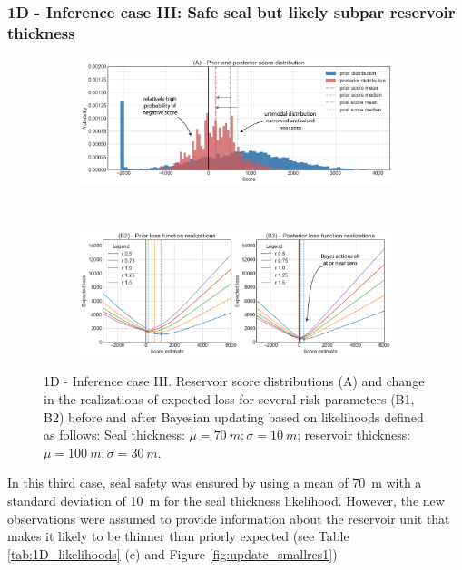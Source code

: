 				\subsubsection{1D - Inference case III: Safe seal but likely subpar reservoir thickness}
				\begin{figure}[h]
					\begin{subfigure}{1\textwidth}
						\centering
						\includegraphics[width=1\linewidth]{Figures/update_smallres2.png}
					\end{subfigure}%
					\\
					\begin{subfigure}{1\textwidth}
						\centering
						\includegraphics[width=1\linewidth]{Figures/update_smallres3.png}
					\end{subfigure}
					\caption{1D - Inference case III. Reservoir score distributions (A) and change in the realizations of expected loss for several risk parameters (B1, B2) before and after Bayesian updating based on likelihoods defined as follows: Seal thickness: $\mu = 70~m; \sigma = 10~m$; reservoir thickness: $\mu = 100~m; \sigma = 30~m$.}
					\label{fig:update_smallres2_3}
				\end{figure}
				In this third case, seal safety was ensured by using a mean of 70~m with a standard deviation of 10~m for the seal thickness likelihood. However, the new observations were assumed to provide information about the reservoir unit that makes it likely to be thinner than priorly expected (see Table \ref{tab:1D_likelihoods} (c) and Figure \ref{fig:update_smallres1})\\
